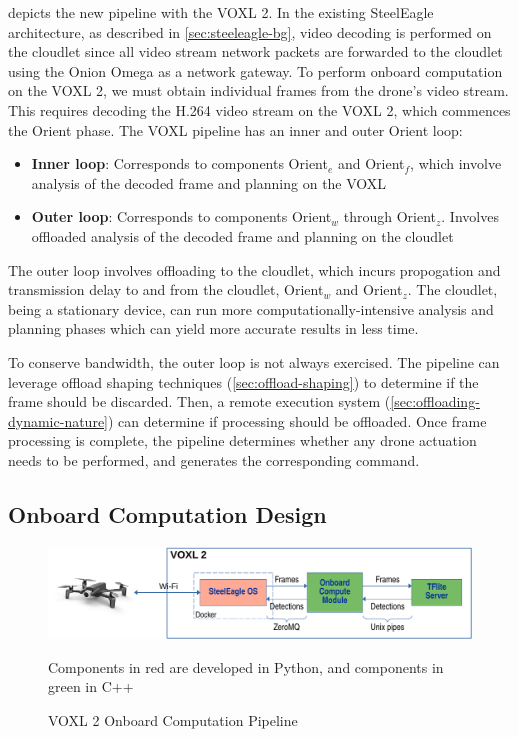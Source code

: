  depicts the new pipeline with the VOXL 2.
In the existing SteelEagle architecture, as described in
\cref{sec:steeleagle-bg}, video decoding is performed on the cloudlet since all
video stream network packets are forwarded to the cloudlet using the Onion
Omega as a network gateway. To perform onboard computation on the VOXL 2, we
must obtain individual frames from the drone's video stream.  This requires
decoding the H.264 video stream on the VOXL 2, which commences the Orient
phase.  The VOXL pipeline has an inner and outer Orient loop:
\begin{itemize}
    \item \textbf{Inner loop}: Corresponds to components Orient$_e$ and
        Orient$_f$, which involve analysis of the decoded frame and planning
        on the VOXL
    \item \textbf{Outer loop}: Corresponds to components Orient$_w$ through
        Orient$_z$. Involves offloaded analysis of the decoded frame and
        planning on the cloudlet
\end{itemize}

The outer loop involves offloading to the cloudlet, which incurs propogation
and transmission delay to and from the cloudlet, Orient$_w$ and Orient$_z$. The
cloudlet, being a stationary device, can run more computationally-intensive
analysis and planning phases which can yield more accurate results in less
time.

To conserve bandwidth, the outer loop is not always exercised.  The pipeline
can leverage offload shaping techniques (\cref{sec:offload-shaping}) to
determine if the frame should be discarded. Then, a remote execution system
(\cref{sec:offloading-dynamic-nature}) can determine if processing should be
offloaded. Once frame processing is complete, the pipeline determines whether
any drone actuation needs to be performed, and generates the corresponding
command.

\subsection{Onboard Computation Design}

\begin{figure}[htbp]
\centering
\includegraphics[width = .9\textwidth]{figs/onboard-design-crop.pdf}
\begin{captext}
Components in red are developed in Python, and components in green in C++
\end{captext}
\caption{VOXL 2 Onboard Computation Pipeline}
\label{fig:voxl2-onboard-pipeline}
\end{figure}

